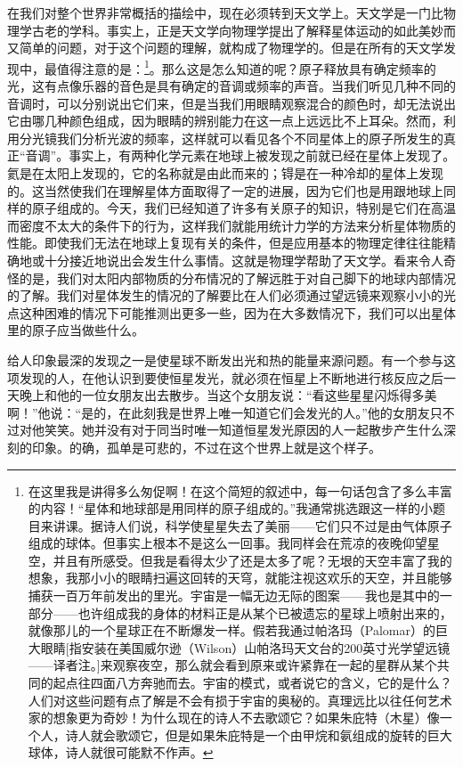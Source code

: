 在我们对整个世界非常概括的描绘中，现在必须转到天文学上。天文学是一门比物理学古老的学科。事实上，正是天文学向物理学提出了解释星体运动的如此美妙而又简单的问题，对于这个问题的理解，就构成了物理学的。但是在所有的天文学发现中，最值得注意的是：\footnote{在这里我是讲得多么匆促啊！在这个简短的叙述中，每一句话包含了多么丰富的内容！“星体和地球部是用同样的原子组成的。”我通常挑选跟这一样的小题目来讲课。据诗人们说，科学使星星失去了美丽——它们只不过是由气体原子组成的球体。但事实上根本不是这么一回事。我同样会在荒凉的夜晚仰望星空，并且有所感受。但我是看得太少了还是太多了呢？无垠的天空丰富了我的想象，我那小小的眼睛扫遍这回转的天穹，就能注视这欢乐的天空，并且能够捕获一百万年前发出的里光。宇宙是一幅无边无际的图案——我也是其中的一部分——也许组成我的身体的材料正是从某个已被遗忘的星球上喷射出来的，就像那儿的一个星球正在不断爆发一样。假若我通过帕洛玛（Palomar）的巨大眼睛[指安装在美国威尔逊（Wilson）山帕洛玛天文台的200英寸光学望远镜——译者注。]来观察夜空，那么就会看到原来或许紧靠在一起的星群从某个共同的起点往四面八方奔驰而去。宇宙的模式，或者说它的含义，它的是什么？人们对这些问题有点了解是不会有损于宇宙的奥秘的。真理远比以往任何艺术家的想象更为奇妙！为什么现在的诗人不去歌颂它？如果朱庇特（木星）像一个人，诗人就会歌颂它，但是如果朱庇特是一个由甲烷和氨组成的旋转的巨大球体，诗人就很可能默不作声。}。那么这是怎么知道的呢？原子释放具有确定频率的光，这有点像乐器的音色是具有确定的音调或频率的声音。当我们听见几种不同的音调时，可以分别说出它们来，但是当我们用眼睛观察混合的颜色时，却无法说出它由哪几种颜色组成，因为眼睛的辨别能力在这一点上远远比不上耳朵。然而，利用分光镜我们分析光波的频率，这样就可以看见各个不同星体上的原子所发生的真正“音调”。事实上，有两种化学元素在地球上被发现之前就已经在星体上发现了。氦是在太阳上发现的，它的名称就是由此而来的；锝是在一种冷却的星体上发现的。这当然使我们在理解星体方面取得了一定的进展，因为它们也是用跟地球上同样的原子组成的。今天，我们已经知道了许多有关原子的知识，特别是它们在高温而密度不太大的条件下的行为，这样我们就能用统计力学的方法来分析星体物质的性能。即使我们无法在地球上复现有关的条件，但是应用基本的物理定律往往能精确地或十分接近地说出会发生什么事情。这就是物理学帮助了天文学。看来令人奇怪的是，我们对太阳内部物质的分布情况的了解远胜于对自己脚下的地球内部情况的了解。我们对星体发生的情况的了解要比在人们必须通过望远镜来观察小小的光点这种困难的情况下可能推测出更多一些，因为在大多数情况下，我们可以出星体里的原子应当做些什么。

给人印象最深的发现之一是使星球不断发出光和热的能量来源问题。有一个参与这项发现的人，在他认识到要使恒星发光，就必须在恒星上不断地进行核反应之后一天晚上和他的一位女朋友出去散步。当这个女朋友说：“看这些星星闪烁得多美啊！”他说：“是的，在此刻我是世界上唯一知道它们会发光的人。”他的女朋友只不过对他笑笑。她并没有对于同当时唯一知道恒星发光原因的人一起散步产生什么深刻的印象。的确，孤单是可悲的，不过在这个世界上就是这个样子。

